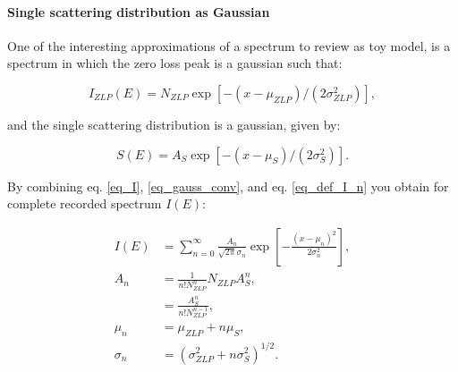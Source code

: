 \paragraph{Single scattering distribution as Gaussian}
One of the interesting approximations of a spectrum to review as toy model, is a spectrum in which the zero loss peak is a gaussian such that:

\begin{equation}\label{eq_ZLP_gauss}
I_{ZLP}(E) = N_{ZLP} \exp{[-(x-\mu_{ZLP})/(2\sigma_{ZLP}^2)]},
\end{equation}

and the single scattering distribution is a gaussian, given by:

\begin{equation}\label{eq_S_gauss_conv}
S(E) = A_{S} \exp{[-(x-\mu_{S})/(2\sigma_{S}^2)]}.
\end{equation}


By combining eq. \eqref{eq_I}, \eqref{eq_gauss_conv}, and eq. \eqref{eq_def_I_n} you obtain for complete recorded spectrum $I(E)$:

\begin{equation}\label{eq_I_gauss_conv}
\begin{aligned}
I(E) &= \sum_{n=0}^{\infty}  \frac{A_{n}}{\sqrt{2\pi}\sigma_n} \exp{\left[-\frac{(x-\mu_{n})^2}{2\sigma_{n}^2}\right]},\\
A_{n} &= \frac{1}{n! N_{ZLP}^n}N_{ZLP} A_S^n, \\
&= \frac{A_S^n}{n!N_{ZLP}^{n-1}}, \\
\mu_{n} &= \mu_{ZLP} + n \mu_S,\\
\sigma_{n} &= (\sigma_{ZLP}^2 + n \sigma_S^2)^{1/2}.
\end{aligned}
\end{equation}





